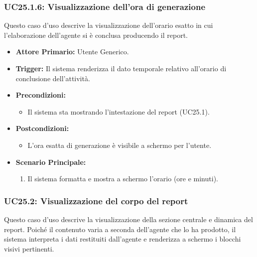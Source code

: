 \documentclass[12pt, a4paper]{article}
\begin{document}
\subsubsection{UC25.1.6: Visualizzazione dell'ora di generazione}\label{uc:25.1.6}
Questo caso d'uso descrive la visualizzazione dell'orario esatto in cui l'elaborazione dell'agente si è conclusa producendo il report.

\begin{itemize}
    \item \textbf{Attore Primario:} Utente Generico.
    \item \textbf{Trigger:} Il sistema renderizza il dato temporale relativo all'orario di conclusione dell'attività.
    \item \textbf{Precondizioni:}
    \begin{itemize}
        \item Il sistema sta mostrando l'intestazione del report (UC25.1).
    \end{itemize}
    \item \textbf{Postcondizioni:}
    \begin{itemize}
        \item L'ora esatta di generazione è visibile a schermo per l'utente.
    \end{itemize}
    \item \textbf{Scenario Principale:}
    \begin{enumerate}
        \item Il sistema formatta e mostra a schermo l'orario (ore e minuti).
    \end{enumerate}
\end{itemize}


\subsubsection{UC25.2: Visualizzazione del corpo del report}\label{uc:25.2}
Questo caso d'uso descrive la visualizzazione della sezione centrale e dinamica del report. Poiché il contenuto varia a seconda dell'agente che lo ha prodotto, il sistema interpreta i dati restituiti dall'agente e renderizza a schermo i blocchi visivi pertinenti.
\end{document}
